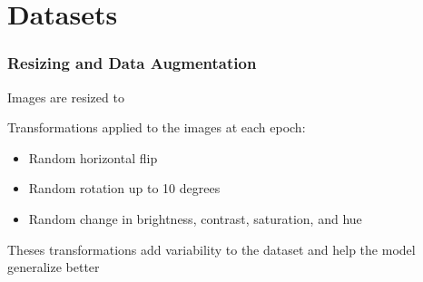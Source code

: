 \documentclass[../presentation.tex]{subfiles} %
\begin{document}
\section{Datasets}

\begin{frame}

    \frametitle{Resizing and Data Augmentation}

		\begin{warning}
			Images are resized to 
		\end{warning}


    \vspace{0.2cm}

    \begin{cbox}
        Transformations applied to the images at each epoch:
        \begin{itemize}
            \item Random horizontal flip
            \item Random rotation up to 10 degrees
            \item Random change in brightness, contrast, saturation, and hue
        \end{itemize}

        \vspace{0.2cm}

        Theses transformations add variability to the dataset and help the model generalize better
    \end{cbox}

\end{frame}
\end{document}
